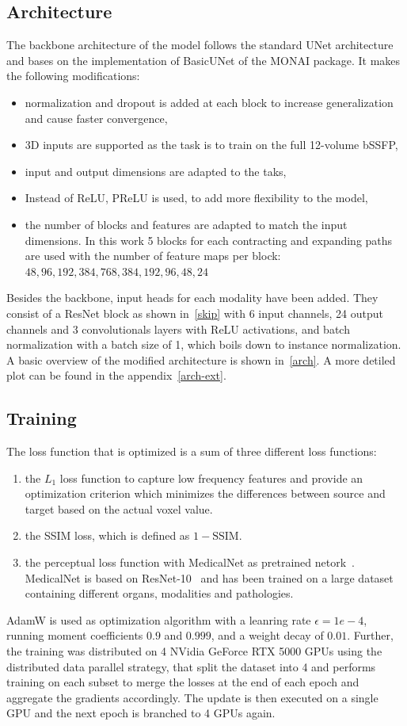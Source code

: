 \subsection{Architecture}
The backbone architecture of the model follows the standard UNet architecture and bases on the implementation of BasicUNet of the MONAI package.
It makes the following modifications:
\begin{itemize}
 \item normalization and dropout is added at each block to increase generalization and cause faster convergence,
 \item 3D inputs are supported as the task is to train on the full 12-volume bSSFP,
 \item input and output dimensions are adapted to the taks,
 \item Instead of ReLU, PReLU is used, to add more flexibility to the model,
 \item the number of blocks and features are adapted to match the input dimensions. In this work 5 blocks for each contracting and expanding paths are used with the number of feature maps per block: $48, 96, 192, 384, 768, 384, 192, 96, 48, 24$
\end{itemize}
Besides the backbone, input heads for each modality have been added.
They consist of a ResNet block as shown in~\ref{skip} with 6 input channels, 24 output channels and 3 convolutionals layers with ReLU activations, and batch normalization with a batch size of 1, which boils down to instance normalization.
A basic overview of the modified architecture is shown in~\ref{arch}.
A more detiled plot can be found in the appendix~\ref{arch-ext}.

\subsection{Training}
The loss function that is optimized is a sum of three different loss functions:
\begin{enumerate}
 \item the $L_1$ loss function to capture low frequency features and provide an optimization criterion which minimizes the differences between source and target based on the actual voxel value.
 \item the SSIM loss, which is defined as $1 - \text{SSIM}$.
 \item the perceptual loss function with MedicalNet as pretrained netork~\autocite{chen_med3d_2019}.
 MedicalNet is based on ResNet-10~\autocite{he_deep_2016} and has been trained on a large dataset containing different organs, modalities and pathologies.
 \end{enumerate}
AdamW is used as optimization algorithm with a leanring rate $\epsilon=1e-4$, running moment coefficients $0.9$ and $0.999$, and a weight decay of $0.01$.
Further, the training was distributed on 4 NVidia GeForce RTX 5000 GPUs using the distributed data parallel strategy, that split the dataset into 4 and performs training on each subset to merge the losses at the end of each epoch and aggregate the gradients accordingly.
The update is then executed on a single GPU and the next epoch is branched to 4 GPUs again.

